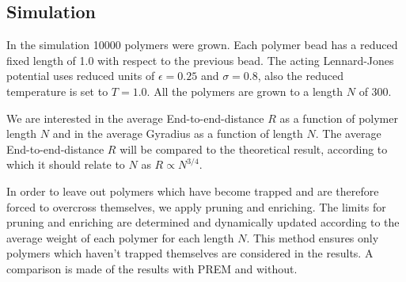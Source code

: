 \subsection*{Simulation}
In the simulation 10000 polymers were grown. Each polymer bead has a reduced fixed length of 1.0 with respect to the previous bead. The acting Lennard-Jones potential uses reduced units of $\epsilon=0.25$ and $\sigma=0.8$, also the reduced temperature is set to $T=1.0$. All the polymers are grown to a length $N$ of 300. 

We are interested in the average End-to-end-distance $R$ as a function of polymer length $N$ and in the average Gyradius as a function of length $N$. The average End-to-end-distance $R$ will be compared to the theoretical result, according to which it should relate to $N$ as $R\propto N^{3/4}$.

In order to leave out polymers which have become trapped and are therefore forced to overcross themselves, we apply pruning and enriching. The limits for pruning and enriching are determined and dynamically updated according to the average weight of each polymer for each length $N$. This method ensures only polymers which haven't trapped themselves are considered in the results. A comparison is made of the results with PREM and without.